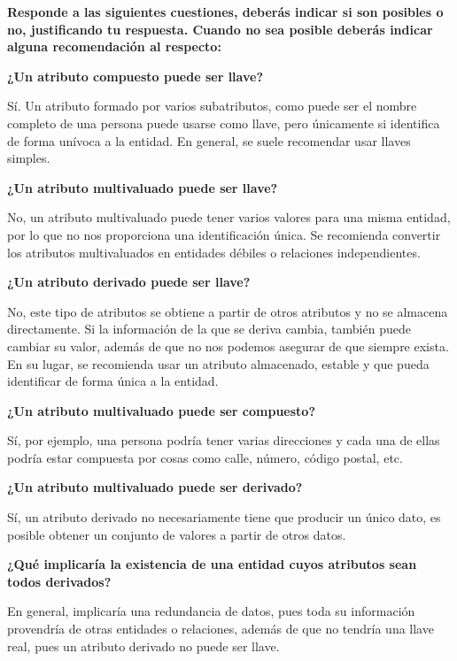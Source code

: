 \item \textbf{Responde a las siguientes cuestiones, deberás indicar si son posibles o no, justificando tu respuesta. Cuando no sea posible deberás indicar alguna recomendación al respecto:}

\textbf{¿Un atributo compuesto puede ser llave?}

Sí. Un atributo formado por varios subatributos, como puede ser el nombre completo de una persona puede usarse como llave, pero únicamente si identifica de forma unívoca a la entidad. En general, se suele recomendar usar llaves simples.

\textbf{¿Un atributo multivaluado puede ser llave?}

No, un atributo multivaluado puede tener varios valores para una misma entidad, por lo que no nos proporciona una identificación única. Se recomienda convertir los atributos multivaluados en entidades débiles o relaciones independientes.

\textbf{¿Un atributo derivado puede ser llave?}

No, este tipo de atributos se obtiene a partir de otros atributos y no se almacena directamente. Si la información de la que se deriva cambia, también puede cambiar su valor, además de que no nos podemos asegurar de que siempre exista. En su lugar, se recomienda usar un atributo almacenado, estable y que pueda identificar de forma única a la entidad.

\textbf{¿Un atributo multivaluado puede ser compuesto?}

Sí, por ejemplo, una persona podría tener varias direcciones y cada una de ellas podría estar compuesta por cosas como calle, número, código postal, etc.

\textbf{¿Un atributo multivaluado puede ser derivado?}

Sí, un atributo derivado no necesariamente tiene que producir un único dato, es posible obtener un conjunto de valores a partir de otros datos.

\textbf{¿Qué implicaría la existencia de una entidad cuyos atributos sean todos derivados?}

En general, implicaría una redundancia de datos, pues toda su información provendría de otras entidades o relaciones, además de que no tendría una llave real, pues un atributo derivado no puede ser llave.
